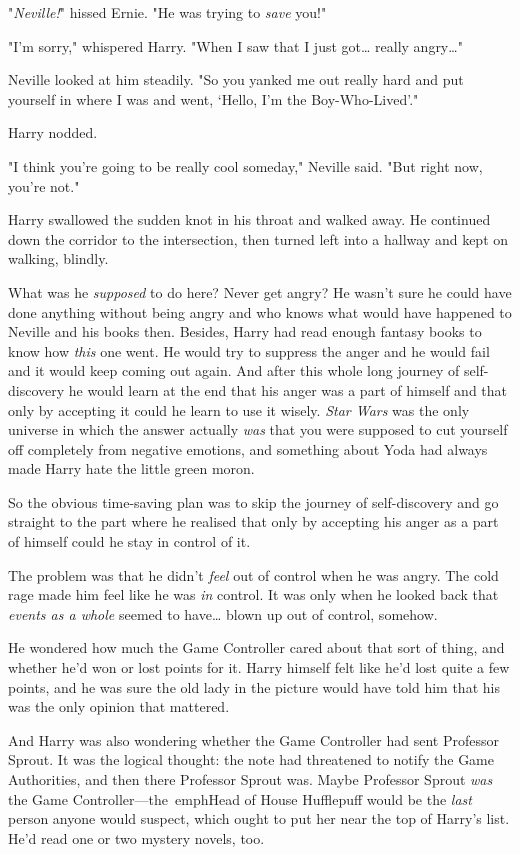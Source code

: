 "\emph{Neville!}" hissed Ernie. "He was trying to \emph{save} you!"

"I'm sorry," whispered Harry. "When I saw that I just got{\ldots} really 
angry{\ldots}"

Neville looked at him steadily. "So you yanked me out really hard and put 
yourself in where I was and went, `Hello, I'm the Boy-Who-Lived'."

Harry nodded.

"I think you're going to be really cool someday," Neville said. "But right now, 
you're not."

Harry swallowed the sudden knot in his throat and walked away. He continued 
down the corridor to the intersection, then turned left into a hallway and kept 
on walking, blindly.

What was he \emph{supposed} to do here? Never get angry? He wasn't sure he 
could have done anything without being angry and who knows what would have 
happened to Neville and his books then. Besides, Harry had read enough fantasy 
books to know how \emph{this} one went. He would try to suppress the anger and 
he would fail and it would keep coming out again. And after this whole long 
journey of self-discovery he would learn at the end that his anger was a part 
of himself and that only by accepting it could he learn to use it wisely. 
\emph{Star Wars} was the only universe in which the answer actually \emph{was} 
that you were supposed to cut yourself off completely from negative emotions, 
and something about Yoda had always made Harry hate the little green moron.

So the obvious time-saving plan was to skip the journey of self-discovery and 
go straight to the part where he realised that only by accepting his anger as a 
part of himself could he stay in control of it.

The problem was that he didn't \emph{feel} out of control when he was angry. 
The cold rage made him feel like he was \emph{in} control. It was only when he 
looked back that \emph{events as a whole} seemed to have{\ldots} blown up out 
of control, somehow.

He wondered how much the Game Controller cared about that sort of thing, and 
whether he'd won or lost points for it. Harry himself felt like he'd lost quite 
a few points, and he was sure the old lady in the picture would have told him 
that his was the only opinion that mattered.

And Harry was also wondering whether the Game Controller had sent Professor 
Sprout. It was the logical thought: the note had threatened to notify the Game 
Authorities, and then there Professor Sprout was. Maybe Professor Sprout 
\emph{was} the Game Controller---the\ emph{Head of House Hufflepuff} would be 
the \emph{last} person anyone would suspect, which ought to put her near the 
top of Harry's list. He'd read one or two mystery novels, too.

